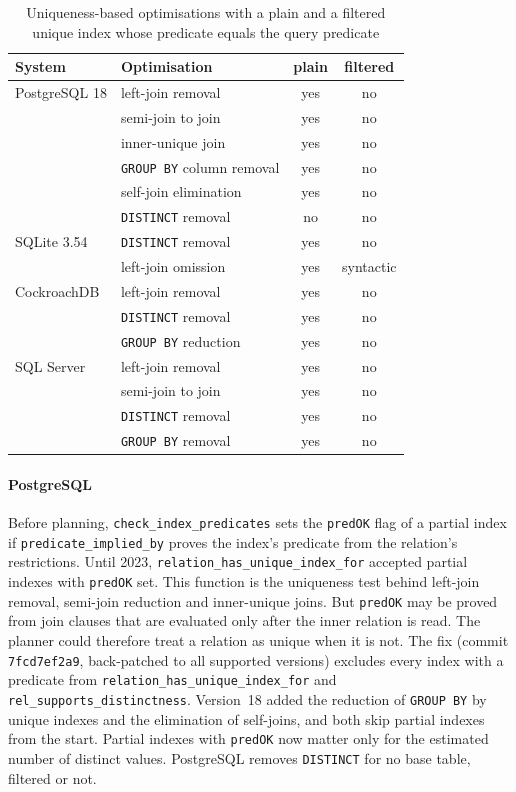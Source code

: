 \documentclass[conference]{IEEEtran}
\theoremstyle{definition}
\newcommand{\sql}[1]{\texttt{#1}}
\newif\ifextended
\begin{document}
\begin{table}[t]
\caption{Uniqueness-based optimisations with a plain and a filtered unique
index whose predicate equals the query predicate}\label{tab:systems}
\centering\small\setlength{\tabcolsep}{4pt}
\begin{tabular}{@{}llcc@{}}
\toprule
System & Optimisation & plain & filtered \\
\midrule
PostgreSQL 18 & left-join removal & yes & no \\
 & semi-join to join & yes & no \\
 & inner-unique join & yes & no \\
 & \sql{GROUP BY} column removal & yes & no \\
 & self-join elimination & yes & no \\
 & \sql{DISTINCT} removal & no & no \\
\midrule
SQLite 3.54 & \sql{DISTINCT} removal & yes & no \\
 & left-join omission & yes & syntactic \\
\midrule
CockroachDB & left-join removal & yes & no \\
 & \sql{DISTINCT} removal & yes & no \\
 & \sql{GROUP BY} reduction & yes & no \\
\midrule
SQL Server & left-join removal & yes & no \\
 & semi-join to join & yes & no \\
 & \sql{DISTINCT} removal & yes & no \\
 & \sql{GROUP BY} removal & yes & no \\
\bottomrule
\end{tabular}
\end{table}

\ifextended
\paragraph*{PostgreSQL} Before planning, \sql{check\_index\_predicates} sets the \sql{predOK} flag of a partial index
if \sql{predicate\_implied\_by} proves the index's predicate from the relation's restrictions. Until 2023,
\sql{relation\_has\_unique\_index\_for} accepted partial indexes with \sql{predOK} set. This function is the uniqueness
test behind left-join removal, semi-join reduction and inner-unique joins. But \sql{predOK} may be proved from join
clauses that are evaluated only after the inner relation is read. The planner could therefore treat a relation as unique
when it is not. The fix (commit \sql{7fcd7ef2a9}, back-patched to all supported versions) excludes every index with a
predicate from \sql{relation\_has\_unique\_index\_for} and \sql{rel\_supports\_distinctness}. Version~18 added the reduction
of \sql{GROUP BY} by unique indexes and the elimination of self-joins, and both skip partial indexes from the start.
Partial indexes with \sql{predOK} now matter only for the estimated number of distinct values. PostgreSQL removes
\sql{DISTINCT} for no base table, filtered or not.
\end{document}
